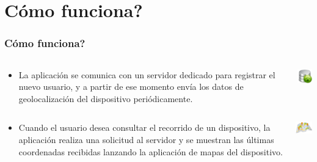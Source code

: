 \section{C\'omo funciona?}

\begin{frame}

\frametitle{C\'omo funciona?}

\begin{columns}
        \begin{column}{.8\textwidth}
        \begin{itemize}
        	\item La aplicaci\'on se comunica con un servidor dedicado para registrar el nuevo usuario, y a 	partir de ese momento env\'ia los datos de geolocalizaci\'on del dispositivo peri\'odicamente.
        \end{itemize}
        \end{column}
        \begin{column}{.2\textwidth}\raggedleft
            \includegraphics[width=1.5cm]{imagenes/upload.png}
        \end{column}
    \end{columns}

\pause

\begin{columns}
    \begin{column}{.8\textwidth}
    \begin{itemize}
    	\item Cuando el usuario desea consultar el recorrido de un dispositivo, la aplicaci\'on realiza una solicitud al servidor y se muestran las \'ultimas coordenadas recibidas lanzando la aplicaci\'on de mapas del dispositivo.
    \end{itemize}
    \end{column}
    \begin{column}{.2\textwidth}\raggedleft
        \includegraphics[width=2cm]{imagenes/manypins.png}
    \end{column}
\end{columns}

\pause


\end{frame}
